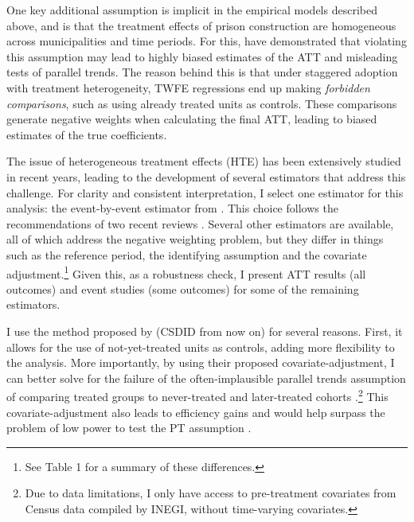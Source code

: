 One key additional assumption is implicit in the empirical models described above, and is that the treatment effects of prison construction are homogeneous across  municipalities and time periods. For this, \cite{Chaise, GoodmanBacon} have demonstrated that violating this assumption may lead to highly biased estimates of the ATT and misleading tests of parallel trends. The reason behind this is that under staggered adoption with treatment heterogeneity, TWFE regressions end up making \textit{forbidden comparisons}, such as using already treated units as controls. These comparisons generate negative weights when calculating the final ATT, leading to biased estimates of the true coefficients. 

The issue of heterogeneous treatment effects (HTE) has been extensively studied in recent years, leading to the development of several estimators that address this challenge. For clarity and consistent interpretation, I select one estimator for this analysis: the event-by-event estimator from \citep{Callaway}. This choice follows the recommendations of two recent reviews \citep{Chaise-ReviewDID, Chiu-ReviewDID}. Several other estimators are available, all of which address the negative weighting problem, but they differ in things such as the reference period, the identifying assumption and the covariate adjustment.\footnote{See \cite{Chiu-ReviewDID} Table 1 for a summary of these differences.} Given this, as a robustness check, I present ATT results (all outcomes) and event studies (some outcomes) for some of the remaining estimators.   

I use the method proposed by \cite{Callaway} (CSDID from now on) for several reasons. First, it allows for the use of not-yet-treated units as controls, adding more flexibility to the analysis. More importantly, by using their proposed covariate-adjustment, I can better solve for the failure of the often-implausible parallel trends assumption of comparing treated groups to never-treated and later-treated cohorts \citep{SantAnna-DR}.\footnote{Due to data limitations, I only have access to pre-treatment covariates from Census data compiled by INEGI, without time-varying covariates.} This covariate-adjustment also leads to efficiency gains and would help surpass the problem of low power to test the PT assumption \citep{Chiu-ReviewDID}.


